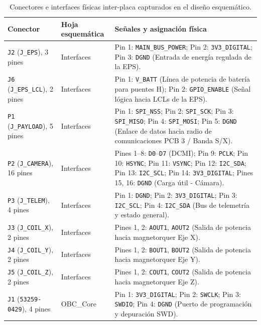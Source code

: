 \documentclass[11pt,a4paper]{article}
\begin{document}
\begin{table}[H]
\centering
\small
\renewcommand{\arraystretch}{1.2}
\begin{tabularx}{\textwidth}{|l|l|X|}
\hline
\textbf{Conector} & \textbf{Hoja esquemática} & \textbf{Señales y asignación física} \\ \hline
\texttt{J2} (\texttt{J\_EPS}), 3 pines & Interfaces & Pin 1: \texttt{MAIN\_BUS\_POWER}; Pin 2: \texttt{3V3\_DIGITAL}; Pin 3: \texttt{DGND} (Entrada de energía regulada de la EPS). \\ \hline
\texttt{J6} (\texttt{J\_EPS\_LCL}), 2 pines & Interfaces & Pin 1: \texttt{V\_BATT} (Línea de potencia de batería para puentes H); Pin 2: \texttt{GPIO\_ENABLE} (Señal lógica hacia LCLs de la EPS). \\ \hline
\texttt{P1} (\texttt{J\_PAYLOAD}), 5 pines & Interfaces & Pin 1: \texttt{SPI\_NSS}; Pin 2: \texttt{SPI\_SCK}; Pin 3: \texttt{SPI\_MISO}; Pin 4: \texttt{SPI\_MOSI}; Pin 5: \texttt{DGND} (Enlace de datos hacia radio de comunicaciones PCB 3 / Banda S/X). \\ \hline
\texttt{P2} (\texttt{J\_CAMERA}), 16 pines & Interfaces & Pines 1--8: \texttt{D0}--\texttt{D7} (DCMI); Pin 9: \texttt{PCLK}; Pin 10: \texttt{HSYNC}; Pin 11: \texttt{VSYNC}; Pin 12: \texttt{I2C\_SDA}; Pin 13: \texttt{I2C\_SCL}; Pin 14: \texttt{3V3\_DIGITAL}; Pines 15, 16: \texttt{DGND} (Carga útil - Cámara). \\ \hline
\texttt{P3} (\texttt{J\_TELEM}), 4 pines & Interfaces & Pin 1: \texttt{DGND}; Pin 2: \texttt{3V3\_DIGITAL}; Pin 3: \texttt{I2C\_SCL}; Pin 4: \texttt{I2C\_SDA} (Bus de telemetría y estado general). \\ \hline
\texttt{J3} (\texttt{J\_COIL\_X}), 2 pines & Interfaces & Pines 1, 2: \texttt{AOUT1}, \texttt{AOUT2} (Salida de potencia hacia magnetorquer Eje X). \\ \hline
\texttt{J4} (\texttt{J\_COIL\_Y}), 2 pines & Interfaces & Pines 1, 2: \texttt{BOUT1}, \texttt{BOUT2} (Salida de potencia hacia magnetorquer Eje Y). \\ \hline
\texttt{J5} (\texttt{J\_COIL\_Z}), 2 pines & Interfaces & Pines 1, 2: \texttt{COUT1}, \texttt{COUT2} (Salida de potencia hacia magnetorquer Eje Z). \\ \hline
\texttt{J1} (\texttt{53259-0429}), 4 pines & OBC\_Core & Pin 1: \texttt{3V3\_DIGITAL}; Pin 2: \texttt{SWCLK}; Pin 3: \texttt{SWDIO}; Pin 4: \texttt{DGND} (Puerto de programación y depuración SWD). \\ \hline
\end{tabularx}
\caption{Conectores e interfaces físicas inter-placa capturados en el diseño esquemático.}
\label{tab:interfaces}
\end{table}
\end{document}
